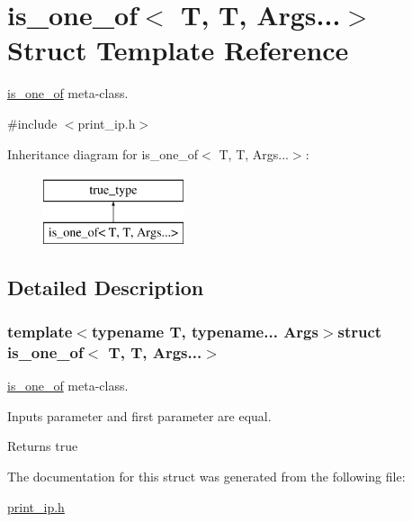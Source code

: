 \hypertarget{structis__one__of_3_01T_00_01T_00_01Args_8_8_8_4}{\section{is\-\_\-one\-\_\-of$<$ T, T, Args...$>$ Struct Template Reference}
\label{structis__one__of_3_01T_00_01T_00_01Args_8_8_8_4}
}


\hyperlink{structis__one__of}{is\-\_\-one\-\_\-of} meta-\/class.  




{\ttfamily \#include $<$print\-\_\-ip.\-h$>$}

Inheritance diagram for is\-\_\-one\-\_\-of$<$ T, T, Args...$>$\-:\begin{figure}[H]
\begin{center}
\leavevmode
\includegraphics[height=2.000000cm]{structis__one__of_3_01T_00_01T_00_01Args_8_8_8_4}
\end{center}
\end{figure}


\subsection{Detailed Description}
\subsubsection*{template$<$typename T, typename... Args$>$struct is\-\_\-one\-\_\-of$<$ T, T, Args...$>$}

\hyperlink{structis__one__of}{is\-\_\-one\-\_\-of} meta-\/class. 

Inputs parameter and first parameter are equal. \begin{DoxyReturn}{Returns}
true 
\end{DoxyReturn}


The documentation for this struct was generated from the following file\-:\begin{DoxyCompactItemize}
\item 
\hyperlink{print__ip_8h}{print\-\_\-ip.\-h}\end{DoxyCompactItemize}
